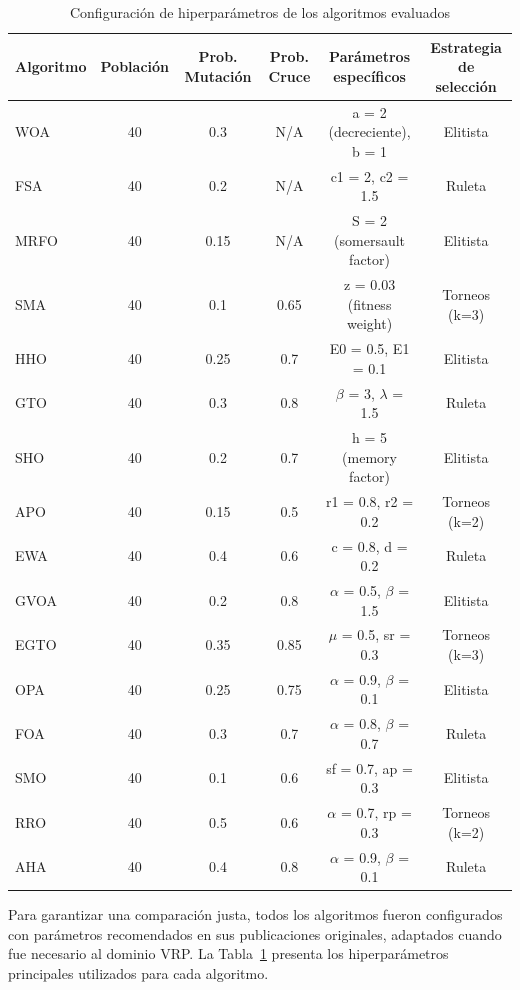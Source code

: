 \documentclass[conference,a4paper]{IEEEtran}
\begin{document}
\begin{table}[t]
  \centering
  \caption{Configuración de hiperparámetros de los algoritmos evaluados}
  \label{tab:hyperparams}
  \footnotesize
  \small
  \begin{tabular}{lccccc}
    \toprule
    \textbf{Algoritmo} & \textbf{Población} & \textbf{Prob. Mutación} & \textbf{Prob. Cruce} & \textbf{Parámetros específicos} & \textbf{Estrategia de selección} \\
    \midrule
    WOA & 40 & 0.3 & N/A & a = 2 (decreciente), b = 1 & Elitista \\
    FSA & 40 & 0.2 & N/A & c1 = 2, c2 = 1.5 & Ruleta \\
    MRFO & 40 & 0.15 & N/A & S = 2 (somersault factor) & Elitista \\
    SMA & 40 & 0.1 & 0.65 & z = 0.03 (fitness weight) & Torneos (k=3) \\
    HHO & 40 & 0.25 & 0.7 & E0 = 0.5, E1 = 0.1 & Elitista \\
    GTO & 40 & 0.3 & 0.8 & $\beta$ = 3, $\lambda$ = 1.5 & Ruleta \\
    SHO & 40 & 0.2 & 0.7 & h = 5 (memory factor) & Elitista \\
    APO & 40 & 0.15 & 0.5 & r1 = 0.8, r2 = 0.2 & Torneos (k=2) \\
    EWA & 40 & 0.4 & 0.6 & c = 0.8, d = 0.2 & Ruleta \\
    GVOA & 40 & 0.2 & 0.8 & $\alpha$ = 0.5, $\beta$ = 1.5 & Elitista \\
    EGTO & 40 & 0.35 & 0.85 & $\mu$ = 0.5, sr = 0.3 & Torneos (k=3) \\
    OPA & 40 & 0.25 & 0.75 & $\alpha$ = 0.9, $\beta$ = 0.1 & Elitista \\
    FOA & 40 & 0.3 & 0.7 & $\alpha$ = 0.8, $\beta$ = 0.7 & Ruleta \\
    SMO & 40 & 0.1 & 0.6 & sf = 0.7, ap = 0.3 & Elitista \\
    RRO & 40 & 0.5 & 0.6 & $\alpha$ = 0.7, rp = 0.3 & Torneos (k=2) \\
    AHA & 40 & 0.4 & 0.8 & $\alpha$ = 0.9, $\beta$ = 0.1 & Ruleta \\
    \bottomrule
  \end{tabular}
\end{table}

Para garantizar una comparación justa, todos los algoritmos fueron configurados con parámetros recomendados en sus publicaciones originales, adaptados cuando fue necesario al dominio VRP. La Tabla~\ref{tab:hyperparams} presenta los hiperparámetros principales utilizados para cada algoritmo.
\end{document}
